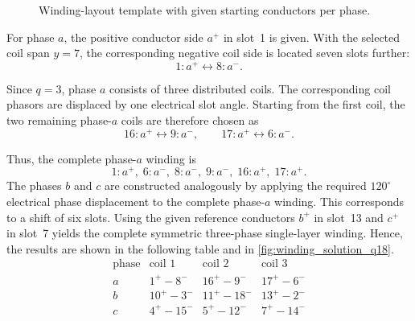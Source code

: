 
\begin{figure}[htb]
	\centering
	\caption{Winding-layout template with given starting conductors per phase.}
	\label{fig:winding_template_q18}
\end{figure}

\begin{solutionblock}
	For phase $a$, the positive conductor side $a^+$ in slot~1 is given.
	With the selected coil span $y=7$, the corresponding negative coil side is located seven slots further:
	\[
		1:a^+ \leftrightarrow 8:a^-.
	\]

	Since $q=3$, phase $a$ consists of three distributed coils. The corresponding coil phasors are displaced by one electrical slot angle. Starting from the first coil, the two remaining phase-$a$ coils are therefore chosen as
	\[
		16:a^+ \leftrightarrow 9:a^-,
		\qquad
		17:a^+ \leftrightarrow 6:a^-.
	\]

	Thus, the complete phase-$a$ winding is
	\[
		1:a^+,\;
		6:a^-,\;
		8:a^-,\;
		9:a^-,\;
		16:a^+,\;
		17:a^+.
	\]
	The phases $b$ and $c$ are constructed analogously by applying the required $120^\circ$ electrical phase displacement to the complete phase-$a$ winding. This corresponds to a shift of six slots. Using the given reference conductors	$b^+$ in slot~13 and $c^+$ in slot~7 yields the complete symmetric three-phase single-layer winding. Hence, the results are shown in the following table and in \autoref{fig:winding_solution_q18}.
	\[
		\begin{array}{c|ccc}
			\text{phase} & \text{coil 1} & \text{coil 2} & \text{coil 3} \\ \hline
			a            & 1^+\!\!-8^-   & 16^+\!\!-9^-  & 17^+\!\!-6^-  \\
			b            & 10^+\!\!-3^-  & 11^+\!\!-18^- & 13^+\!\!-2^-  \\
			c            & 4^+\!\!-15^-  & 5^+\!\!-12^-  & 7^+\!\!-14^-
		\end{array}
	\]
	\begin{solutionfigure}[htb]
		\centering
		\caption{Completed 18-slot single-layer winding layout.}
		\label{fig:winding_solution_q18}
	\end{solutionfigure}

\end{solutionblock}

